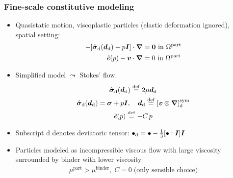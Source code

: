 \documentclass[11pt]{beamer} %
\renewcommand{\dev}{\mathrm{d}}
\newcommand{\particle}{\mathrm{part}}
\renewcommand{\alert}[1]{\textbf{#1}}
\begin{document}
\begin{frame}
 \frametitle{Fine-scale constitutive modeling}
 \begin{itemize}
  \item Quasistatic motion, viscoplastic particles (elastic deformation ignored), spatial setting:
  \begin{align*}
   -[\hat{\ts\sigma}_\dev(\ts d_\dev) - p\ts I]\cdot\ta\nabla &= \ta 0 \text{ in } \Omega^\particle
    \\
    \hat{e}(p) - \ta v\cdot\ta\nabla &= 0\text{ in } \Omega^\particle%
  \end{align*}
  \item Simplified model $\leadsto$ Stokes' flow.
  \begin{gather*}
   \hat{\ts\sigma}_\dev(\ts d_\dev) \defeq 2\mu {\ts d}_\dev\\
   \hat{\ts\sigma}_\dev(\ts d_\dev) = \ts\sigma + p\ts I,\quad \ts d_\dev \defeq [\ts v\outerp \diff]_\dev^\sym
   \\
   \hat{e}(p) \defeq -C\,p
  \end{gather*}
  \item Subscript $\dev$ denotes deviatoric tensor: $\bullet_\dev = \bullet - \frac13 [\bullet:\ts I]\ts I$
  \item Particles modeled as incompressible viscous flow with large viscosity surrounded by binder with lower viscosity
  \begin{align*}
   \mu^{\mathrm{part}} > \mu^{\mathrm{binder}},\; C = 0\;\text{(only sensible choice)}
  \end{align*}
 \end{itemize}
\end{frame}
\end{document}

